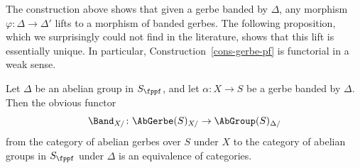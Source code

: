 The construction above shows that given a gerbe banded by $\Delta$,
any morphism $\varphi\colon \Delta \to \Delta'$ lifts to a morphism of banded gerbes.
The following proposition,
which we surprisingly could not find in the literature,
shows that this lift is essentially unique.
In particular, Construction~\ref{cons-gerbe-pf} is functorial in a weak sense.

\begin{proposition}
\label{gerbe-functorial-group}
Let $\Delta$ be an abelian group in $S_\fppf$,
and let $\alpha\colon X \to S$ be a gerbe banded by $\Delta$.
Then the obvious functor
\begin{equation}
\Band_{X/} \colon \AbGerbe(S)_{X/} \to \AbGroup(S)_{\Delta/}
\end{equation}
from the category of abelian gerbes over $S$ under $X$ to the category of abelian groups in $S_\fppf$
under $\Delta$ is an equivalence of categories.
\end{proposition}
